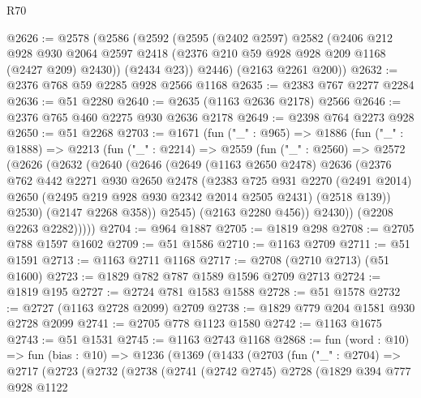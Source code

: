 \begin{lexlean}{R70}
\begin{coremodule}
@2626 := @2578
    (@2586
      (@2592
        (@2595
          (@2402 @2597)
          @2582
          (@2406
            @212
            @928
            @930
            @2064
            @2597
            @2418
            (@2376 @210 @59 @928 @928 @209 @1168 (@2427 @209) @2430))
          (@2434 @23))
        @2446)
      (@2163 @2261 @200))
@2632 := @2376 @768 @59 @2285 @928 @2566 @1168
@2635 := @2383 @767 @2277 @2284
@2636 := @51 @2280
@2640 := @2635 (@1163 @2636 @2178) @2566
@2646 := @2376 @765 @460 @2275 @930 @2636 @2178
@2649 := @2398 @764 @2273 @928
@2650 := @51 @2268
@2703 := @1671
    (fun ("_" : @965) =>
    @1886
      (fun ("_" : @1888) =>
      @2213
        (fun ("_" : @2214) =>
        @2559
          (fun ("_" : @2560) =>
          @2572
            (@2626
              (@2632
                (@2640
                  (@2646
                    (@2649
                      (@1163 @2650 @2478)
                      @2636
                      (@2376
                        @762
                        @442
                        @2271
                        @930
                        @2650
                        @2478
                        (@2383
                          @725
                          @931
                          @2270
                          (@2491 @2014)
                          @2650
                          (@2495 @219 @928 @930 @2342 @2014 @2505 @2431)
                          (@2518 @139))
                        @2530)
                      (@2147 @2268 @358))
                    @2545)
                  (@2163 @2280 @456))
                @2430))
            (@2208 @2263 @2282)))))
@2704 := @964 @1887
@2705 := @1819 @298
@2708 := @2705 @788 @1597 @1602
@2709 := @51 @1586
@2710 := @1163 @2709
@2711 := @51 @1591
@2713 := @1163 @2711 @1168
@2717 := @2708 (@2710 @2713) (@51 @1600)
@2723 := @1829 @782 @787 @1589 @1596 @2709 @2713
@2724 := @1819 @195
@2727 := @2724 @781 @1583 @1588
@2728 := @51 @1578
@2732 := @2727 (@1163 @2728 @2099) @2709
@2738 := @1829 @779 @204 @1581 @930 @2728 @2099
@2741 := @2705 @778 @1123 @1580
@2742 := @1163 @1675
@2743 := @51 @1531
@2745 := @1163 @2743 @1168
@2868 := fun (word : @10) =>
  fun (bias : @10) =>
  @1236
    (@1369
      (@1433
        (@2703
          (fun ("_" : @2704) =>
          @2717
            (@2723
              (@2732
                (@2738
                  (@2741
                    (@2742 @2745)
                    @2728
                    (@1829
                      @394
                      @777
                      @928
                      @1122

\end{coremodule}
\end{lexlean}
